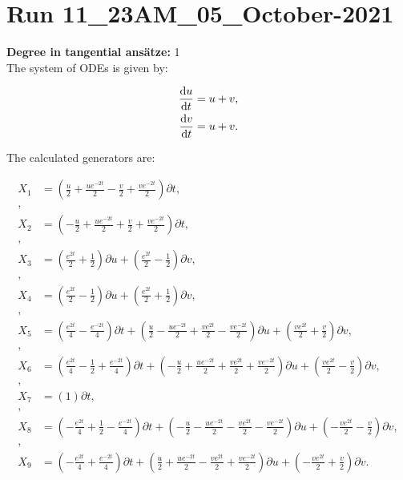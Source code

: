 \section*{Run 11\_23AM\_05\_October-2021}
\textbf{Degree in tangential ansätze:}	1\\
The system of ODEs is given by:

\begin{align*}
\dv{u}{t}&=u + v,\\
\dv{v}{t}&=u + v.\\
\end{align*}

\noindent The calculated generators are:

\begin{align*}
X_{1}&=\left( \frac{u}{2} + \frac{u e^{- 2 t}}{2} - \frac{v}{2} + \frac{v e^{- 2 t}}{2} \right)\partial t,\\
,\\
X_{2}&=\left( - \frac{u}{2} + \frac{u e^{- 2 t}}{2} + \frac{v}{2} + \frac{v e^{- 2 t}}{2} \right)\partial t,\\
,\\
X_{3}&=\left( \frac{e^{2 t}}{2} + \frac{1}{2} \right)\partial u+\left( \frac{e^{2 t}}{2} - \frac{1}{2} \right)\partial v,\\
,\\
X_{4}&=\left( \frac{e^{2 t}}{2} - \frac{1}{2} \right)\partial u+\left( \frac{e^{2 t}}{2} + \frac{1}{2} \right)\partial v,\\
,\\
X_{5}&=\left( \frac{e^{2 t}}{4} - \frac{e^{- 2 t}}{4} \right)\partial t+\left( \frac{u}{2} - \frac{u e^{- 2 t}}{2} + \frac{v e^{2 t}}{2} - \frac{v e^{- 2 t}}{2} \right)\partial u+\left( \frac{v e^{2 t}}{2} + \frac{v}{2} \right)\partial v,\\
,\\
X_{6}&=\left( \frac{e^{2 t}}{4} - \frac{1}{2} + \frac{e^{- 2 t}}{4} \right)\partial t+\left( - \frac{u}{2} + \frac{u e^{- 2 t}}{2} + \frac{v e^{2 t}}{2} + \frac{v e^{- 2 t}}{2} \right)\partial u+\left( \frac{v e^{2 t}}{2} - \frac{v}{2} \right)\partial v,\\
,\\
X_{7}&=\left( 1 \right)\partial t,\\
,\\
X_{8}&=\left( - \frac{e^{2 t}}{4} + \frac{1}{2} - \frac{e^{- 2 t}}{4} \right)\partial t+\left( - \frac{u}{2} - \frac{u e^{- 2 t}}{2} - \frac{v e^{2 t}}{2} - \frac{v e^{- 2 t}}{2} \right)\partial u+\left( - \frac{v e^{2 t}}{2} - \frac{v}{2} \right)\partial v,\\
,\\
X_{9}&=\left( - \frac{e^{2 t}}{4} + \frac{e^{- 2 t}}{4} \right)\partial t+\left( \frac{u}{2} + \frac{u e^{- 2 t}}{2} - \frac{v e^{2 t}}{2} + \frac{v e^{- 2 t}}{2} \right)\partial u+\left( - \frac{v e^{2 t}}{2} + \frac{v}{2} \right)\partial v.\\
\end{align*}
